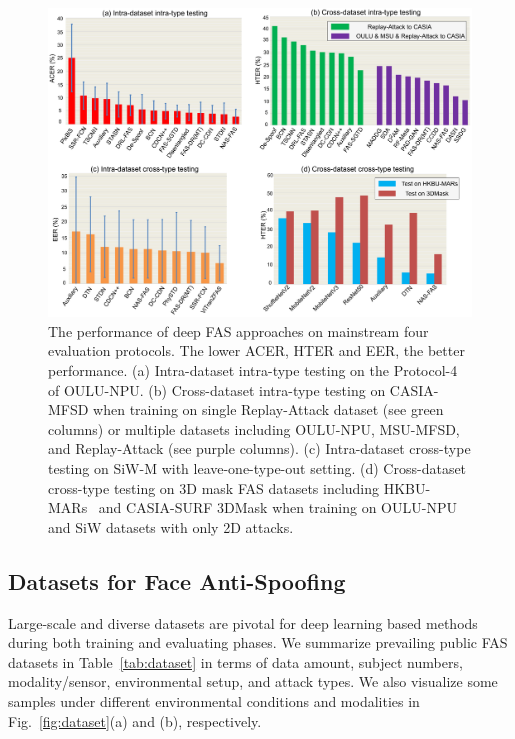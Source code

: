 \documentclass[10pt,journal,compsoc]{IEEEtran}
\begin{document}
\begin{figure}
\centering
\includegraphics[scale=0.28]{Figures/protocols.pdf}
\vspace{-1.0em}
  \caption{ 
  The performance of deep FAS approaches on mainstream four evaluation protocols. The lower ACER, HTER and EER, the better performance. (a) Intra-dataset intra-type testing on the Protocol-4 of OULU-NPU. (b) Cross-dataset intra-type testing on CASIA-MFSD when training on single Replay-Attack dataset (see green columns) or multiple datasets including OULU-NPU, MSU-MFSD, and Replay-Attack (see purple columns). (c) Intra-dataset cross-type testing on SiW-M with leave-one-type-out setting. (d) Cross-dataset cross-type testing on 3D mask FAS datasets including HKBU-MARs~\cite{liu20163d} and CASIA-SURF 3DMask when training on OULU-NPU and SiW datasets with only 2D attacks. 
  }
\label{fig:protocols}
\end{figure}





\subsection{Datasets for Face Anti-Spoofing}

Large-scale and diverse datasets are pivotal for deep learning based methods during both training and evaluating phases. We summarize prevailing public FAS datasets in Table~\ref{tab:dataset} in terms of data amount, subject numbers, modality/sensor, environmental setup, and attack types. We also visualize some samples under different environmental conditions and modalities in Fig.~\ref{fig:dataset}(a) and (b), respectively. 
\end{document}
